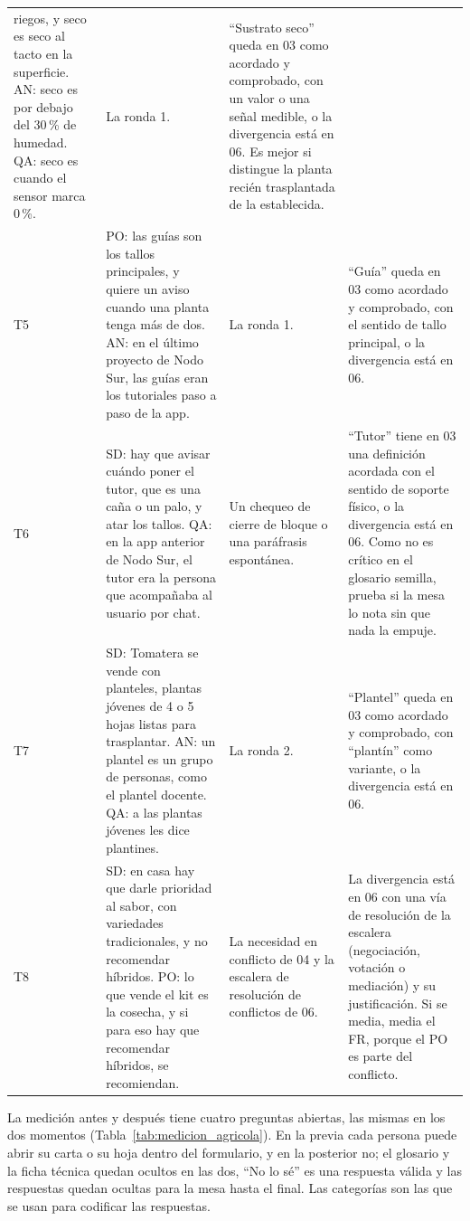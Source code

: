 \documentclass[12pt,letterpaper,oneside]{report}
\begin{document}
{\begin{xltabular}{\textwidth}{@{}L{0.6cm} Y L{2.3cm} Y@{}}
riegos, y seco es seco al tacto en la superficie. AN: seco es por debajo del
30\,\% de humedad. QA: seco es cuando el sensor marca 0\,\%. & La ronda 1. & ``Sustrato
seco'' queda en 03 como acordado y comprobado, con un valor o una señal medible,
o la divergencia está en 06. Es mejor si distingue la planta recién trasplantada
de la establecida. \\
\addlinespace
T5 & PO: las guías son los tallos principales, y quiere un aviso cuando una
planta tenga más de dos. AN: en el último proyecto de Nodo Sur, las guías eran
los tutoriales paso a paso de la app. & La ronda 1. & ``Guía'' queda en 03 como acordado y
comprobado, con el sentido de tallo principal, o la divergencia está en 06. \\
\addlinespace
T6 & SD: hay que avisar cuándo poner el tutor, que es una caña o un palo, y atar
los tallos. QA: en la app anterior de Nodo Sur, el tutor era la persona que
acompañaba al usuario por chat. & Un chequeo de cierre de bloque o una
paráfrasis espontánea. & ``Tutor'' tiene en 03 una definición acordada
con el sentido de soporte físico, o la divergencia está en 06. Como no es
crítico en el glosario semilla, prueba si la mesa lo nota sin que nada la
empuje. \\
\addlinespace
T7 & SD: Tomatera se vende con planteles, plantas jóvenes de 4 o 5 hojas listas
para trasplantar. AN: un plantel es un grupo de personas, como el plantel
docente. QA: a las plantas jóvenes les dice plantines. & La ronda 2. & ``Plantel'' queda en 03
como acordado y comprobado, con ``plantín'' como variante, o la divergencia está
en 06. \\
\addlinespace
T8 & SD: en casa hay que darle prioridad al sabor, con variedades tradicionales,
y no recomendar híbridos. PO: lo que vende el kit es la cosecha, y si para eso
hay que recomendar híbridos, se recomiendan. & La necesidad en conflicto de 04 y la escalera de resolución de conflictos
de 06. & La divergencia está en 06 con una
vía de resolución de la escalera (negociación, votación o mediación) y su
justificación. Si se media, media el FR, porque el PO es parte del conflicto. \\
\end{xltabular}}

La medición antes y después tiene cuatro preguntas abiertas, las mismas en los
dos momentos (Tabla~\ref{tab:medicion_agricola}). En la previa cada persona
puede abrir su carta o su hoja dentro del formulario, y en la posterior no; el
glosario y la ficha técnica quedan ocultos en las dos, ``No lo sé'' es una
respuesta válida y las respuestas quedan ocultas para la mesa hasta el final.
Las categorías son las que se usan para codificar las respuestas.
\end{document}
